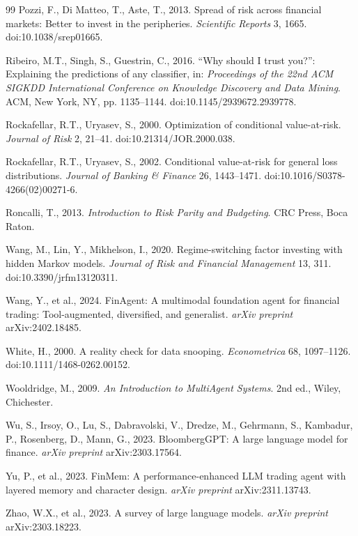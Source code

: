 \documentclass[11pt]{article}
\begin{document}
\begin{thebibliography}{99}
Pozzi, F., Di Matteo, T., Aste, T., 2013. Spread of risk across financial markets: Better to invest in the peripheries. \textit{Scientific Reports} 3, 1665. doi:10.1038/srep01665.

Ribeiro, M.T., Singh, S., Guestrin, C., 2016. ``Why should I trust you?'': Explaining the predictions of any classifier, in: \textit{Proceedings of the 22nd ACM SIGKDD International Conference on Knowledge Discovery and Data Mining}. ACM, New York, NY, pp. 1135--1144. doi:10.1145/2939672.2939778.

Rockafellar, R.T., Uryasev, S., 2000. Optimization of conditional value-at-risk. \textit{Journal of Risk} 2, 21--41. doi:10.21314/JOR.2000.038.

Rockafellar, R.T., Uryasev, S., 2002. Conditional value-at-risk for general loss distributions. \textit{Journal of Banking \& Finance} 26, 1443--1471. doi:10.1016/S0378-4266(02)00271-6.

Roncalli, T., 2013. \textit{Introduction to Risk Parity and Budgeting}. CRC Press, Boca Raton.

Wang, M., Lin, Y., Mikhelson, I., 2020. Regime-switching factor investing with hidden Markov models. \textit{Journal of Risk and Financial Management} 13, 311. doi:10.3390/jrfm13120311.

Wang, Y., et al., 2024. FinAgent: A multimodal foundation agent for financial trading: Tool-augmented, diversified, and generalist. \textit{arXiv preprint} arXiv:2402.18485.

White, H., 2000. A reality check for data snooping. \textit{Econometrica} 68, 1097--1126. doi:10.1111/1468-0262.00152.

Wooldridge, M., 2009. \textit{An Introduction to MultiAgent Systems}. 2nd ed., Wiley, Chichester.

Wu, S., Irsoy, O., Lu, S., Dabravolski, V., Dredze, M., Gehrmann, S., Kambadur, P., Rosenberg, D., Mann, G., 2023. BloombergGPT: A large language model for finance. \textit{arXiv preprint} arXiv:2303.17564.

Yu, P., et al., 2023. FinMem: A performance-enhanced LLM trading agent with layered memory and character design. \textit{arXiv preprint} arXiv:2311.13743.

Zhao, W.X., et al., 2023. A survey of large language models. \textit{arXiv preprint} arXiv:2303.18223.


\end{thebibliography}
\end{document}
